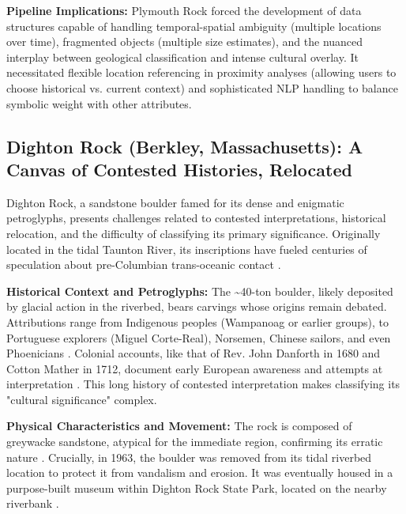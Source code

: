 \textbf{Pipeline Implications:} Plymouth Rock forced the development of data structures capable of handling temporal-spatial ambiguity (multiple locations over time), fragmented objects (multiple size estimates), and the nuanced interplay between geological classification and intense cultural overlay. It necessitated flexible location referencing in proximity analyses (allowing users to choose historical vs. current context) and sophisticated NLP handling to balance symbolic weight with other attributes.

\subsection{Dighton Rock (Berkley, Massachusetts): A Canvas of Contested Histories, Relocated}
\label{subsec:dighton}

Dighton Rock, a sandstone boulder famed for its dense and enigmatic petroglyphs, presents challenges related to contested interpretations, historical relocation, and the difficulty of classifying its primary significance. Originally located in the tidal Taunton River, its inscriptions have fueled centuries of speculation about pre-Columbian trans-oceanic contact \cite{Lenik2009, Delabarre1928}.

\textbf{Historical Context and Petroglyphs:} The \textasciitilde40-ton boulder, likely deposited by glacial action in the riverbed, bears carvings whose origins remain debated. Attributions range from Indigenous peoples (Wampanoag or earlier groups), to Portuguese explorers (Miguel Corte-Real), Norsemen, Chinese sailors, and even Phoenicians \cite{Lenik2009, Pohl1950}. Colonial accounts, like that of Rev. John Danforth in 1680 and Cotton Mather in 1712, document early European awareness and attempts at interpretation \cite{Lenik2009, Delabarre1928}. This long history of contested interpretation makes classifying its "cultural significance" complex.

\textbf{Physical Characteristics and Movement:} The rock is composed of greywacke sandstone, atypical for the immediate region, confirming its erratic nature \cite{Delabarre1928}. Crucially, in 1963, the boulder was removed from its tidal riverbed location to protect it from vandalism and erosion. It was eventually housed in a purpose-built museum within Dighton Rock State Park, located on the nearby riverbank \cite{Lenik2009, MassDCRDighton}.

